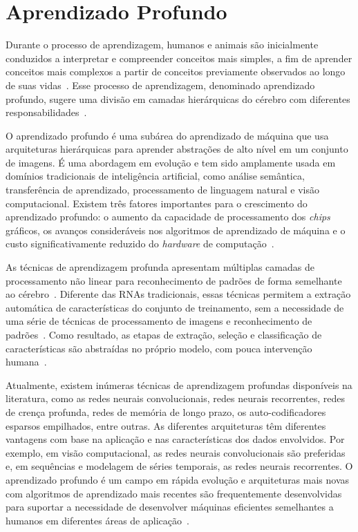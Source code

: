
\section{Aprendizado Profundo}
\label{sec:aprendizado-profundo}

Durante o processo de aprendizagem, humanos e animais são inicialmente conduzidos a interpretar e compreender conceitos mais simples, a fim de aprender conceitos mais complexos a partir de conceitos previamente observados ao longo de suas vidas~\cite{fernandes2013redes}. Esse processo de aprendizagem, denominado aprendizado profundo, sugere uma divisão em camadas hierárquicas do cérebro com diferentes responsabilidades~\cite{hubel1998early}.

O aprendizado profundo é uma subárea do aprendizado de máquina que usa arquiteturas hierárquicas para aprender abstrações de alto nível em um conjunto de imagens. É uma abordagem em evolução e tem sido amplamente usada em domínios tradicionais de inteligência artificial, como análise semântica, transferência de aprendizado, processamento de linguagem natural e visão computacional. Existem três fatores importantes para o crescimento do aprendizado profundo: o aumento da capacidade de processamento dos \textit{chips} gráficos, os avanços consideráveis nos algoritmos de aprendizado de máquina e o custo significativamente reduzido do \textit{hardware} de computação~\cite{GUO201627}.

As técnicas de aprendizagem profunda apresentam múltiplas camadas de processamento não linear para reconhecimento de padrões de forma semelhante ao cérebro~\cite{LeCun2015}. Diferente das RNAs tradicionais, essas técnicas permitem a extração automática de características do conjunto de treinamento, sem a necessidade de uma série de técnicas de processamento de imagens e reconhecimento de padrões~\cite{hua2015computer}. Como resultado, as etapas de extração, seleção e classificação de características são abstraídas no próprio modelo, com pouca intervenção humana~\cite{hua2015computer,cheng2016computer}.

Atualmente, existem inúmeras técnicas de aprendizagem profundas disponíveis na literatura, como as redes neurais convolucionais, redes neurais recorrentes, redes de crença profunda, redes de memória de longo prazo, os auto-codificadores esparsos empilhados, entre outras. As diferentes arquiteturas têm diferentes vantagens com base na aplicação e nas características dos dados envolvidos. Por exemplo, em visão computacional, as redes neurais convolucionais são preferidas e, em sequências e modelagem de séries temporais, as redes neurais recorrentes. O aprendizado profundo é um campo em rápida evolução e arquiteturas mais novas com algoritmos de aprendizado mais recentes são frequentemente desenvolvidas para suportar a necessidade de desenvolver máquinas eficientes semelhantes a humanos em diferentes áreas de aplicação~\cite{SENGUPTA2020}.

